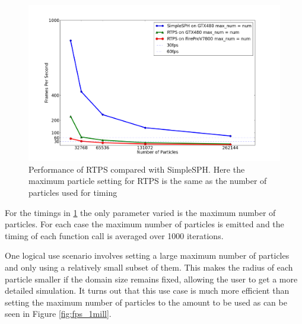 \begin{figure}[!htc]
 		\centering
        \includegraphics[width=\columnwidth]{figures/maxnum_eq_num_fps.png}
        \caption{ {\footnotesize Performance of RTPS compared with SimpleSPH. Here the maximum
        particle setting for RTPS is the same as the number of particles used
        for timing}}
        \label{fig:fps_num}
\end{figure}

For the timings in \ref{fig:fps_num} the only parameter varied is the maximum number of particles.
For each case the maximum number of particles is emitted and the timing of each
function call is averaged over 1000 iterations.


One logical use scenario involves setting a large maximum number of
particles and only using a relatively small subset of them. This makes the
radius of each particle smaller if the domain size remains fixed, allowing the
user to get a more detailed simulation. It turns out that this use case is much
more efficient than setting the maximum number of particles to the amount to be
used as can be seen in Figure \ref{fig:fps_1mill}.


